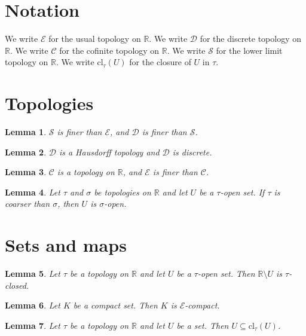 \documentclass{article}
\newtheorem{lemma}{Lemma}
\begin{document}
\section{Notation}

We write $\mathcal{E}$ for the usual topology on $\mathbb{R}$.
We write $\mathcal{D}$ for the discrete topology on $\mathbb{R}$.
We write $\mathcal{C}$ for the cofinite topology on $\mathbb{R}$.
We write $\mathcal{S}$ for the lower limit topology on $\mathbb{R}$.
We write $\mathrm{cl}_\tau(U)$ for the closure of $U$ in $\tau$.

\section{Topologies}

\begin{lemma}\label{finer}
$\mathcal{S}$ is finer than $\mathcal{E}$, and $\mathcal{D}$ is finer than $\mathcal{S}$.
\end{lemma}

\begin{lemma}\label{discrete}
$\mathcal{D}$ is a Hausdorff topology and $\mathcal{D}$ is discrete.
\end{lemma}

\begin{lemma}\label{cofinite}
$\mathcal{C}$ is a topology on $\mathbb{R}$, and $\mathcal{E}$ is finer than $\mathcal{C}$.
\end{lemma}

\begin{lemma}\label{coarser}
Let $\tau$ and $\sigma$ be topologies on $\mathbb{R}$ and let $U$ be a $\tau$-open set. If $\tau$ is coarser than $\sigma$, then $U$ is $\sigma$-open.
\end{lemma}

\section{Sets and maps}

\begin{lemma}\label{closed}
Let $\tau$ be a topology on $\mathbb{R}$ and let $U$ be a $\tau$-open set. Then $\mathbb{R}\setminus U$ is $\tau$-closed.
\end{lemma}

\begin{lemma}\label{compact}
Let $K$ be a compact set. Then $K$ is $\mathcal{E}$-compact.
\end{lemma}

\begin{lemma}\label{closure}
Let $\tau$ be a topology on $\mathbb{R}$ and let $U$ be a set. Then $U\subseteq\mathrm{cl}_\tau(U)$.
\end{lemma}
\end{document}
